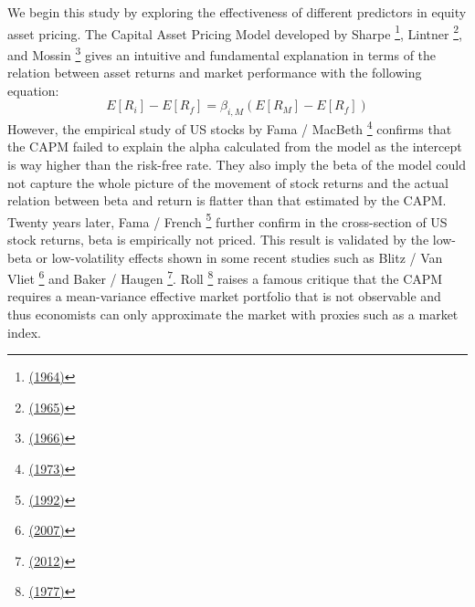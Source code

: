 \documentclass[a4paper,12pt]{article}
\begin{document}
We begin this study by exploring the effectiveness of different predictors in equity asset pricing.
The Capital Asset Pricing Model developed by Sharpe \footnote{\protect\hyperlink{ref-RN62}{(1964)}}, Lintner \footnote{\protect\hyperlink{ref-RN63}{(1965)}}, and Mossin \footnote{\protect\hyperlink{ref-RN64}{(1966)}} gives an intuitive and fundamental explanation in terms of the relation between asset returns and market performance with the following equation:
\begin{equation}
\tag{1}
E\left[R_i\right]-E\left[R_f\right]=\beta_{i,M}\left(E\left[R_M\right]-E\left[R_f\right]\right)
\end{equation}
However, the empirical study of US stocks by Fama / MacBeth \footnote{\protect\hyperlink{ref-RN72}{(1973)}} confirms that the CAPM failed to explain the alpha calculated from the model as the intercept is way higher than the risk-free rate. They also imply the beta of the model could not capture the whole picture of the movement of stock returns and the actual relation between beta and return is flatter than that estimated by the CAPM. Twenty years later, Fama / French \footnote{\protect\hyperlink{ref-RN67}{(1992)}} further confirm in the cross-section of US stock returns, beta is empirically not priced. This result is validated by the low-beta or low-volatility effects shown in some recent studies such as Blitz / Van Vliet \footnote{\protect\hyperlink{ref-RN76}{(2007)}} and Baker / Haugen \footnote{\protect\hyperlink{ref-RN77}{(2012)}}. Roll \footnote{\protect\hyperlink{ref-RN78}{(1977)}} raises a famous critique that the CAPM requires a mean-variance effective market portfolio that is not observable and thus economists can only approximate the market with proxies such as a market index.
\end{document}
